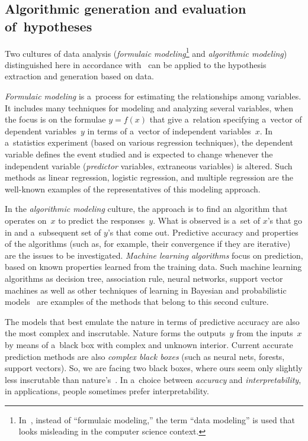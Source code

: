 \begin{multicols}{2}
\vspace*{-6pt}

\subsection{Algorithmic generation and evaluation of~hypotheses}

\vspace*{-2pt}

\noindent
  Two cultures of data analysis (\textit{formulaic modeling}\footnote{In~\cite{36-kl},
instead of ``formulaic modeling,'' the term ``data modeling'' is used that looks misleading in the computer science
context.} and \textit{algorithmic modeling}) distinguished here in accordance
with~\cite{36-kl} can be applied to the hypothesis extraction and generation based on data.

  \textit{Formulaic modeling} is a~process for estimating the relationships among variables. It includes many techniques for modeling and analyzing several variables,
when the focus is on the formulae $y = f(x)$ that give a~relation specifying a~vector of dependent variables~$y$ in terms of a~vector of independent variables~$x$. In a~statistics experiment
(based on various regression techniques), the dependent variable
defines the event studied and is expected to change whenever the independent
variable (\textit{predictor} variables, extraneous variables) is altered.
Such methods as linear regression, logistic regression, and multiple regression are
the well-known examples of the representatives of this modeling approach.


  In the \textit{algorithmic modeling} culture, the approach is to find an algorithm
that operates on~$x$ to predict the responses~$y$. What is observed is a~set of $x$'s that go in and a~subsequent set of $y$'s that come out. Predictive accuracy and properties of the algorithms (such as,
for example, their convergence if they are iterative) are the issues to be investigated. \textit{Machine learning algorithms} focus on prediction, based on known properties learned from the training data. Such machine learning algorithms as decision tree, association rule, neural networks, support vector
machines as well as other techniques of learning in Bayesian and probabilistic
models~\cite{38-kl, 37-kl} are examples of the methods that belong to this second
culture.

  The models that best emulate the nature in terms of predictive accuracy are also the
most complex and inscrutable. Nature forms the outputs~$y$
from the inputs~$x$ by means of a~black box with complex and unknown interior.
Current accurate
prediction methods are also \textit{complex black boxes} (such as neural nets,
forests, support vectors). So, we are facing two black boxes, where ours seem
only slightly less inscrutable than nature's~\cite{36-kl}. In a~choice
between \textit{accuracy} and
\textit{interpretability}, in applications, people sometimes prefer interpretability.


\end{multicols}
